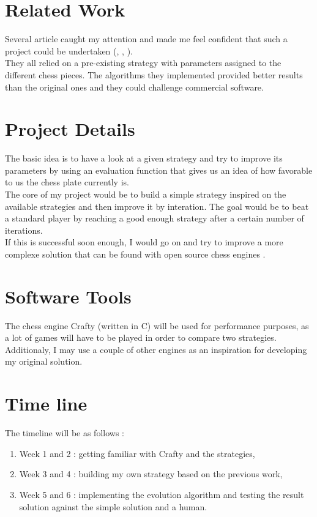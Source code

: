 \documentclass[runningheads]{llncs}
\begin{document}
\section{Related Work}
Several article caught my attention and made me feel confident that such a project could be undertaken (\cite{Kendall:2006}, \cite{Fogel:2004}, \cite{Kendall:2001}).\\

They all relied on a pre-existing strategy with parameters assigned to the different chess pieces. The algorithms they implemented provided better results than the original ones and they could challenge commercial software.

\section{Project Details}
The basic idea is to have a look at a given strategy and try to improve its parameters by using an evaluation function that gives us an idea of how favorable to us the chess plate currently is.\\
The core of my project would be to build a simple strategy inspired on the available strategies and then improve it by interation. The goal would be to beat a standard player by reaching a good enough strategy after a certain number of iterations.\\
If this is successful soon enough, I would go on and try to improve a more complexe solution that can be found with open source chess engines \cite{crafty}.

\section{Software Tools}
The chess engine Crafty \cite{crafty} (written in C) will be used for performance purposes, as a lot of games will have to be played in order to compare two strategies.\\
Additionaly, I may use a couple of other engines as an inspiration for developing my original solution.

\section{Time line}
The timeline will be as follows :
\begin{enumerate}
\item Week 1 and 2 : getting familiar with Crafty and the strategies,
\item Week 3 and 4 : building my own strategy based on the previous work,
\item Week 5 and 6 : implementing the evolution algorithm and testing the result solution against the simple solution and a human.
\end{enumerate}
\end{document}
